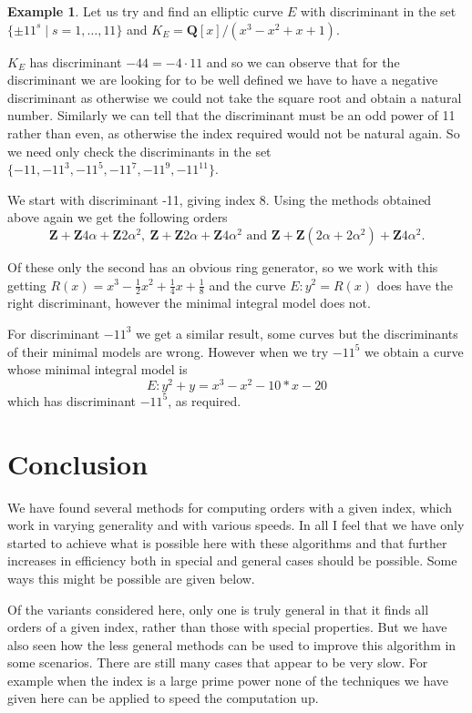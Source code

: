\documentclass[12pt,a4paper,abstracton,bibtotoc]{scrreprt}
\theoremstyle{definition}
\newtheorem{ex}{Example}
\newcommand{\QQ}{\mathbf{Q}}
\newcommand{\ZZ}{\mathbf{Z}}
\begin{document}
\begin{ex}
Let us try and find an elliptic curve $E$ with discriminant in the set $\{\pm 11^s\mid s = 1,\ldots,11\}$ and $K_E = \QQ[x]/(x^3 - x^2 + x + 1)$.

$K_E$ has discriminant $-44 = -4\cdot 11$ and so we can observe that for the discriminant we are looking for to be well defined we have to have a negative discriminant as otherwise we could not take the square root and obtain a natural number.
Similarly we can tell that the discriminant must be an odd power of 11 rather than even, as otherwise the index required would not be natural again.
So we need only check the discriminants in the set $\{-11,-11^3,-11^5,-11^7,-11^9,-11^11\}$.

We start with discriminant -11, giving index 8.
Using the methods obtained above again we get the following orders
\[
\ZZ + \ZZ4\alpha + \ZZ2\alpha^2,\ \ZZ + \ZZ2\alpha + \ZZ4\alpha^2\text{ and } \ZZ + \ZZ(2\alpha + 2\alpha^2) + \ZZ4\alpha^2.
\]

Of these only the second has an obvious ring generator, so we work with this getting $R(x) = x^3 -\frac{1}{2}x^2 + \frac{1}{4}x + \frac{1}{8}$ and the curve $E\colon y^2 = R(x)$ does have the right discriminant, however the minimal integral model does not.

For discriminant $-11^3$ we get a similar result, some curves but the discriminants of their minimal models are wrong.
However when we try $-11^5$ we obtain a curve whose minimal integral model is
\[
E\colon y^2 + y = x^3 - x^2 - 10*x - 20
\]
which has discriminant $-11^5$, as required.
\end{ex}

\chapter{Conclusion}
We have found several methods for computing orders with a given index, which work in varying generality and with various speeds.
In all I feel that we have only started to achieve what is possible here with these algorithms and that further increases in efficiency both in special and general cases should be possible.
Some ways this might be possible are given below.

Of the variants considered here, only one is truly general in that it finds all orders of a given index, rather than those with special properties.
But we have also seen how the less general methods can be used to improve this algorithm in some scenarios.
There are still many cases that appear to be very slow.
For example when the index is a large prime power none of the techniques we have given here can be applied to speed the computation up.
\end{document}
